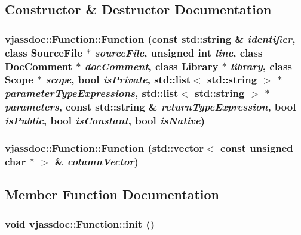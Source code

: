 \subsection{Constructor \& Destructor Documentation}
\hypertarget{classvjassdoc_1_1Function_3505663616782b94aa01a36b789a101b}{
\subsubsection{\setlength{\rightskip}{0pt plus 5cm}vjassdoc::Function::Function (const std::string \& {\em identifier}, class {\bf SourceFile} $\ast$ {\em sourceFile}, unsigned int {\em line}, class {\bf DocComment} $\ast$ {\em docComment}, class {\bf Library} $\ast$ {\em library}, class {\bf Scope} $\ast$ {\em scope}, bool {\em isPrivate}, std::list$<$ std::string $>$ $\ast$ {\em parameterTypeExpressions}, std::list$<$ std::string $>$ $\ast$ {\em parameters}, const std::string \& {\em returnTypeExpression}, bool {\em isPublic}, bool {\em isConstant}, bool {\em isNative})}}
\label{classvjassdoc_1_1Function_3505663616782b94aa01a36b789a101b}


\hypertarget{classvjassdoc_1_1Function_3afaafa500bcad415988b9882528b0a7}{
\subsubsection{\setlength{\rightskip}{0pt plus 5cm}vjassdoc::Function::Function (std::vector$<$ const unsigned char $\ast$ $>$ \& {\em columnVector})}}
\label{classvjassdoc_1_1Function_3afaafa500bcad415988b9882528b0a7}




\subsection{Member Function Documentation}
\hypertarget{classvjassdoc_1_1Function_031d74f7df7c29afb36626fd335b2037}{
\subsubsection{\setlength{\rightskip}{0pt plus 5cm}void vjassdoc::Function::init ()}}
\label{classvjassdoc_1_1Function_031d74f7df7c29afb36626fd335b2037}




